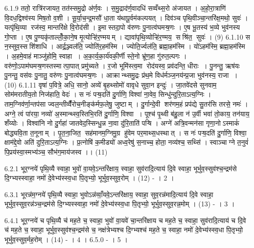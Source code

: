 6.1.9
ततो॒ रात्रि॑रजायत॒ तत॑स्समु॒द्रो अ॑र्ण॒वः । स॒मु॒द्राद॑र्ण॒वादधि॑ सव्वँथ्स॒रो अ॑जायत । अ॒हो॒रा॒त्राणि॑ वि॒दध॒द्विश्व॑स्य मिष॒तो व॒शी । सू॒र्या॒च॒न्द्र॒मसौ॑ धा॒ता य॑थापू॒र्वम॑कल्पयत् । दिव॑ञ्च पृथि॒वीञ्चा॒न्तरि॑क्ष॒मथो॒ सुवः॑ । यत्पृ॑थि॒व्या रज॑स्व॒ मान्तरि॑क्षे वि॒रोद॑सी । इ॒मास्तदा॒पो व॑रुणः पु॒नात्व॑घमऱ्ष॒णः । ए॒ष भू॒तस्य॑ भ॒व्ये भुव॑नस्य गो॒प्ता । ए॒ष पु॒ण्यकृ॑ताल्लोँ॒का॒ने॒ष मृ॒त्योऱ्हि॑र॒ण्मयम् । द्यावा॑पृथि॒व्योऱ्हि॑र॒ण्मय॒ सश्रि॑त॒ सुवः॑ । (9)
6.1.10
स न॒स्सुव॒स्सशि॑शाधि । आर्द्र॒ञ्ज्वल॑ति॒ ज्योति॑र॒हम॑स्मि । ज्योति॒र्ज्वल॑ति॒ ब्रह्मा॒हम॑स्मि । यो॑ऽहम॑स्मि॒ ब्रह्मा॒हम॑स्मि । अ॒हमे॒वाहं माञ्जु॑होमि॒ स्वाहा । अ॒का॒र्य॒का॒र्य॑वकी॒र्णी स्ते॒नो भ्रू॑ण॒हा गु॑रुत॒ल्पगः । वरु॑णो॒ऽपाम॑घमऱ्ष॒णस्तस्मात्पा॒पात् प्रमु॑च्यते । र॒जो भूमि॑स्त्व॒मा रोद॑यस्व॒ प्रव॑दन्ति॒ धीराः । पु॒नन्तु॒ ऋष॑यः पु॒नन्तु॒ वस॑वः पु॒नातु॒ वरु॑णः पु॒नात्व॑घमऱ्ष॒णः । आक्रान्थ्समु॒द्रः प्र॑थ॒मे विध॑र्मञ्ज॒नय॑न्प्र॒जा भुव॑नस्य॒ राजा । (10)
6.1.11
वृषा॑ प॒वित्रे॒ अधि॒ सानो॒ अव्ये॑ बृ॒हथ्सोमो॑ वावृधे सुवा॒न इन्दुः॑ । जा॒तवे॑दसे सुनवाम॒ सोम॑मरातीय॒तो निज॑हाति॒ वेदः॑ । स नः॑ पऱ्ष॒दति॑ दु॒र्गाणि॒ विश्वा॑ ना॒वेव॒ सिन्धु॑न्दुरि॒ताऽत्य॒ग्निः । ताम॒ग्निव॑र्णा॒न्तप॑सा ज्वल॒न्तीव्वैँ॑रोच॒नीङ्क॑र्मफ॒लेषु॒ जुष्टाम् । दु॒र्गान्दे॒वी शर॑णम॒हं प्रप॑द्ये सु॒तर॑सि तरसे॒ नमः॑ । अग्ने॒ त्वं पा॑रया॒ नव्यो॑ अ॒स्मान्थ्स्व॒स्तिभि॒रति॑ दु॒र्गाणि॒ विश्वा । पूश्च॑ पृ॒थ्वी ब॑हु॒ला न॑ उ॒र्वी भवा॑ तो॒काय॒ तन॑याय॒ शँय्योः । विश्वा॑नि नो दु॒र्गहा॑ जातवेद॒स्सिन्धु॒न्न ना॒वा दु॑रि॒ताति॑ पऱ्षि । अग्ने॑ अत्रि॒वन्मन॑सा गृणा॒नोऽस्माकं॑ बोद्ध्यवि॒ता त॒नूनाम् । पृ॒त॒ना॒जित॒ सह॑मानम॒ग्निमु॒ग्र हु॑वेम पर॒माथ्स॒धस्थात् । स नः॑ पऱ्ष॒दति॑ दु॒र्गाणि॒ विश्वा॒ क्षाम॑द्दे॒वो अति॑ दुरि॒ताऽत्य॒ग्निः । प्र॒त्नोषि॑ क॒मीड्यो॑ अध्व॒रेषु॑ स॒नाच्च॒ होता॒ नव्य॑श्च॒ सथ्सि॑ । स्वाञ्चाग्ने त॒नुवं॑ पि॒प्रय॑स्वा॒स्मभ्य॑ञ्च॒ सौभ॑ग॒माय॑जस्व ।। (11)
\anuvakamend


6.2.1
भूर॒ग्नये॑ पृथि॒व्यै स्वाहा॒ भुवो॑ वा॒यवे॒ऽन्तरि॑क्षाय॒ स्वाहा॒ सुव॑रादि॒त्याय॑ दि॒वे स्वाहा॒ भूर्भुव॒स्सुव॑श्च॒न्द्रम॑से दि॒ग्भ्यस्स्वाहा॒ नमो॑ दे॒वेभ्य॑स्स्व॒धा पि॒तृभ्यो॒ भूर्भुव॒स्सुव॒रोम् । (12) - । 2 ।
\anuvakamend

6.3.1
भूरन्न॑म॒ग्नये॑ पृथि॒व्यै स्वाहा॒ भुवोऽन्न॑व्वाँ॒यवे॒ऽन्तरि॑क्षाय॒ स्वाहा॒ सुव॒रन्न॑मादि॒त्याय॑ दि॒वे स्वाहा॒ भूर्भुव॒स्सुव॒रन्न॑ञ्च॒न्द्रम॑से दि॒ग्भ्यस्स्वाहा॒ नमो॑ दे॒वेभ्य॑स्स्व॒धा पि॒तृभ्यो॒ भूर्भुव॒स्सुव॒रन्न॒मोम् । (13) - । 3 ।
\anuvakamend

6.4.1
भूर॒ग्नये॑ च पृथि॒व्यै च॑ मह॒ते च॒ स्वाहा॒ भुवो॑ वा॒यवे॑ चा॒न्तरि॑क्षाय च मह॒ते च॒ स्वाहा॒ सुव॑रादि॒त्याय॑ च दि॒वे च॑ मह॒ते च॒ स्वाहा॒ भूर्भुव॒स्सुव॑श्च॒न्द्रम॑से च॒ नक्ष॑त्रेभ्यश्च दि॒ग्भ्यश्च॑ मह॒ते च॒ स्वाहा॒ नमो॑ दे॒वेभ्य॑स्स्व॒धा पि॒तृभ्यो॒ भूर्भुव॒स्सुव॒र्मह॒रोम् । (14) - । 4 ।
6.5.0
- । 5 ।
\anuvakamend

